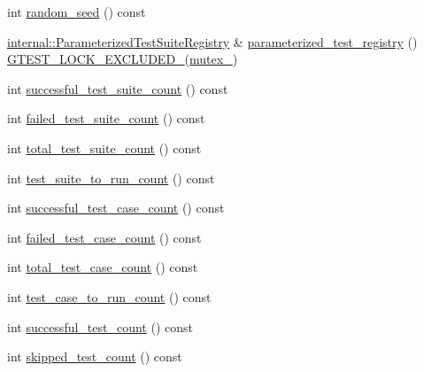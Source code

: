 \begin{DoxyCompactItemize}
\item 
int \mbox{\hyperlink{classtesting_1_1_unit_test_adddc090a06f2d3a0e68f3762ee262688}{random\+\_\+seed}} () const
\item 
\mbox{\hyperlink{classtesting_1_1internal_1_1_parameterized_test_suite_registry}{internal\+::\+Parameterized\+Test\+Suite\+Registry}} \& \mbox{\hyperlink{classtesting_1_1_unit_test_a8f9c5d0d9f1b6d23c94070944a43c550}{parameterized\+\_\+test\+\_\+registry}} () \mbox{\hyperlink{_obj__test_2lib_2googletest-release-1_88_81_2googletest_2include_2gtest_2internal_2gtest-port_8h_a69abff5a4efdd07bd5faebe3dd318d06}{G\+T\+E\+S\+T\+\_\+\+L\+O\+C\+K\+\_\+\+E\+X\+C\+L\+U\+D\+E\+D\+\_\+}}(\mbox{\hyperlink{classtesting_1_1_unit_test_abb94ef45cf0ab43be81ac6d5b1364132}{mutex\+\_\+}})
\item 
int \mbox{\hyperlink{classtesting_1_1_unit_test_aefa4c6654fed9a70c6c5ca61abae2234}{successful\+\_\+test\+\_\+suite\+\_\+count}} () const
\item 
int \mbox{\hyperlink{classtesting_1_1_unit_test_a118a74c8cc3845653893ed17245f44ac}{failed\+\_\+test\+\_\+suite\+\_\+count}} () const
\item 
int \mbox{\hyperlink{classtesting_1_1_unit_test_af8ed6d43a95405a860fdd898bf0c1a87}{total\+\_\+test\+\_\+suite\+\_\+count}} () const
\item 
int \mbox{\hyperlink{classtesting_1_1_unit_test_ade4726c8283513bd2b3391c600503790}{test\+\_\+suite\+\_\+to\+\_\+run\+\_\+count}} () const
\item 
int \mbox{\hyperlink{classtesting_1_1_unit_test_acaa2ab71f53c25ffe0242a91c14e173f}{successful\+\_\+test\+\_\+case\+\_\+count}} () const
\item 
int \mbox{\hyperlink{classtesting_1_1_unit_test_abc0fa297a4103f7cdd9627ae27d9d0ef}{failed\+\_\+test\+\_\+case\+\_\+count}} () const
\item 
int \mbox{\hyperlink{classtesting_1_1_unit_test_a93fc8f4eebc3212d06468ad216830ced}{total\+\_\+test\+\_\+case\+\_\+count}} () const
\item 
int \mbox{\hyperlink{classtesting_1_1_unit_test_a965248fbe72f9fede5de921b6666943b}{test\+\_\+case\+\_\+to\+\_\+run\+\_\+count}} () const
\item 
int \mbox{\hyperlink{classtesting_1_1_unit_test_a49ee8056e357ad497e67399447dd5a40}{successful\+\_\+test\+\_\+count}} () const
\item 
int \mbox{\hyperlink{classtesting_1_1_unit_test_a0082c74809be04baf7e43842ddac4ae5}{skipped\+\_\+test\+\_\+count}} () const
\item 

\end{DoxyCompactItemize}
